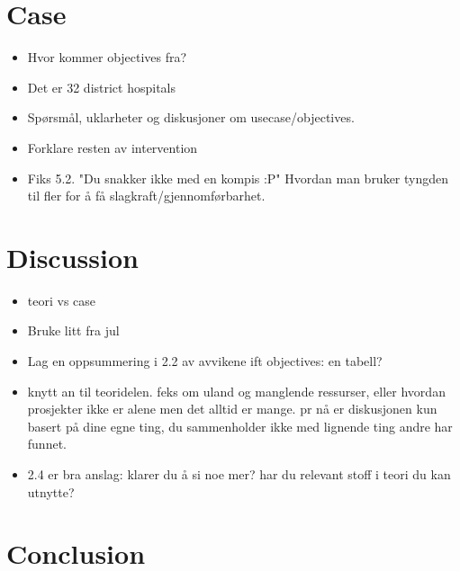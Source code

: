 \documentclass{article}
\begin{document}
\section{Case}
\begin{itemize}
\item Hvor kommer objectives fra?
\item Det er 32 district hospitals
\item Spørsmål, uklarheter og diskusjoner om usecase/objectives.
\item Forklare resten av intervention
\item Fiks 5.2. "Du snakker ikke med en kompis :P" Hvordan man bruker tyngden til fler for å få slagkraft/gjennomførbarhet.
\end{itemize}
\section{Discussion}
\begin{itemize}
\item teori vs case
\item Bruke litt fra jul
\item Lag en oppsummering i 2.2 av avvikene ift objectives: en tabell?
\item knytt an til teoridelen. feks om uland og manglende ressurser, eller hvordan prosjekter
  ikke er alene men det alltid er mange. pr nå er diskusjonen kun basert på dine egne ting, du
  sammenholder ikke med lignende ting andre har funnet.
\item 2.4 er bra anslag: klarer du å si noe mer? har du relevant stoff i teori du kan utnytte?
\end{itemize}
\section{Conclusion}
\end{document}
